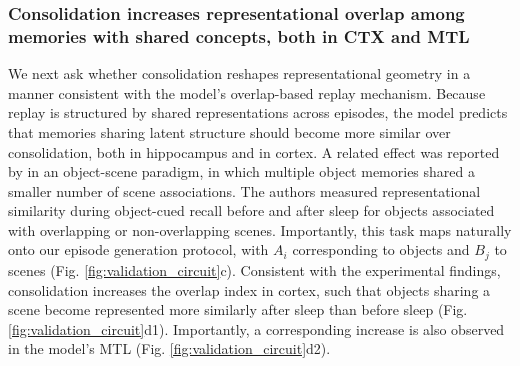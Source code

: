 \documentclass{article}
\begin{document}
\subsubsection*{Consolidation increases representational overlap among memories with shared concepts, both in CTX and MTL}
We next ask whether consolidation reshapes representational geometry in a manner consistent with the model's overlap-based replay mechanism. Because replay is structured by shared representations across episodes, the model predicts that memories sharing latent structure should become more similar over consolidation, both in hippocampus and in cortex.  A related effect was reported by  in an object-scene paradigm, in which multiple object memories shared a smaller number of scene associations. The authors measured representational similarity during object-cued recall before and after sleep for objects associated with overlapping or non-overlapping scenes. Importantly, this task maps naturally onto our episode generation protocol, with $A_i$ corresponding to objects and $B_j$ to scenes (Fig. \ref{fig:validation_circuit}c). Consistent with the experimental findings, consolidation increases the overlap index in cortex, such that objects sharing a scene become represented more similarly after sleep than before sleep (Fig. \ref{fig:validation_circuit}d1). Importantly, a corresponding increase is also observed in the model's MTL (Fig. \ref{fig:validation_circuit}d2).
\end{document}

